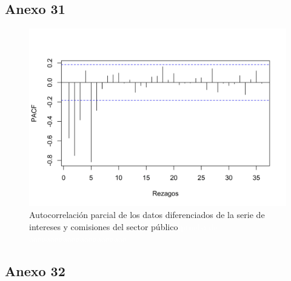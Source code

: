 \documentclass[
]{article}
\begin{document}

\subsection{Anexo 31}

\begin{figure}[H]
\includegraphics[width=1\linewidth,height=1\textheight]{Tesis_files/figure-latex/intereses_pacf-1} \caption{Autocorrelación parcial de los datos diferenciados de la serie de intereses y comisiones del sector público \textcolor{white}{prueba de aaaaaaaaaaaaaaaaaaaaaaa}}\label{fig:intereses_pacf}
\end{figure}

\subsection{Anexo 32}
\end{document}
